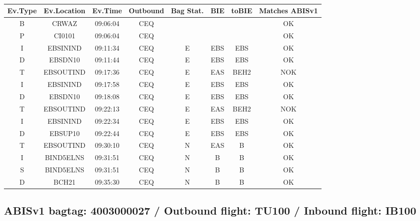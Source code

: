 \documentclass{report}
\begin{document}
\paragraph{}
\begin{longtable}{cccccccc}    \toprule
\rowcolor{white!50}
\textbf{Ev.Type} & \textbf{Ev.Location} & \textbf{Ev.Time} & \textbf{Outbound} & \textbf{Bag Stat.} & \textbf{BIE} & \textbf{toBIE} & \textbf{Matches ABISv1} \\\midrule
B & CRWAZ & 09:06:04  & CEQ &  &  &  & OK\\
P & CI0101 & 09:06:04  & CEQ &  &  &  & OK\\
I & EBSININD & 09:11:34  & CEQ & E & EBS & EBS & OK\\
D & EBSDN10 & 09:11:44  & CEQ & E & EBS & EBS & OK\\
T & EBSOUTIND & 09:17:36  & CEQ & E & EAS & BEH2 & NOK\\
I & EBSININD & 09:17:58  & CEQ & E & EBS & EBS & OK\\
D & EBSDN10 & 09:18:08  & CEQ & E & EBS & EBS & OK\\
T & EBSOUTIND & 09:22:13  & CEQ & E & EAS & BEH2 & NOK\\
I & EBSININD & 09:22:34  & CEQ & E & EBS & EBS & OK\\
D & EBSUP10 & 09:22:44  & CEQ & E & EBS & EBS & OK\\
T & EBSOUTIND & 09:30:10  & CEQ & N & EAS & B & OK\\
I & BIND5ELNS & 09:31:51  & CEQ & N & B & B & OK\\
S & BIND5ELNS & 09:31:51  & CEQ & N & B & B & OK\\
D & BCH21 & 09:35:30  & CEQ & N & B & B & OK\\
\bottomrule
\end{longtable}
\subsection*{ABISv1 bagtag: 4003000027 / Outbound flight: TU100 / Inbound flight: IB100}
\end{document}
